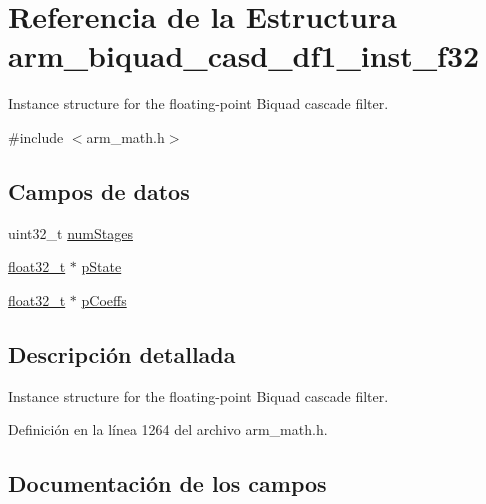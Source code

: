 \hypertarget{structarm__biquad__casd__df1__inst__f32}{}\section{Referencia de la Estructura arm\+\_\+biquad\+\_\+casd\+\_\+df1\+\_\+inst\+\_\+f32}
\label{structarm__biquad__casd__df1__inst__f32}


Instance structure for the floating-\/point Biquad cascade filter.  




{\ttfamily \#include $<$arm\+\_\+math.\+h$>$}

\subsection*{Campos de datos}
\begin{DoxyCompactItemize}
\item 
uint32\+\_\+t \hyperlink{structarm__biquad__casd__df1__inst__f32_aed9c8a6224cd149e8e12b17b25b9b767}{num\+Stages}
\item 
\hyperlink{arm__math_8h_a4611b605e45ab401f02cab15c5e38715}{float32\+\_\+t} $\ast$ \hyperlink{structarm__biquad__casd__df1__inst__f32_a335c87e6fdc4b96601d95a5de8b9c463}{p\+State}
\item 
\hyperlink{arm__math_8h_a4611b605e45ab401f02cab15c5e38715}{float32\+\_\+t} $\ast$ \hyperlink{structarm__biquad__casd__df1__inst__f32_aacbb8dd8eeba4b21fc2bb40076405ee3}{p\+Coeffs}
\end{DoxyCompactItemize}


\subsection{Descripción detallada}
Instance structure for the floating-\/point Biquad cascade filter. 

Definición en la línea 1264 del archivo arm\+\_\+math.\+h.



\subsection{Documentación de los campos}
